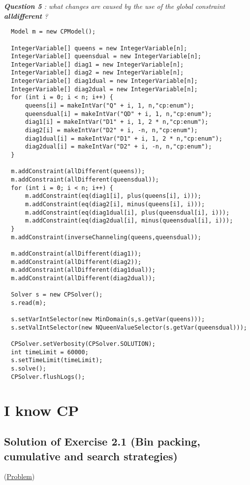 \noindent\emph{\textbf{Question 5} : what changes are caused by the use of the global constraint \textbf{alldifferent} ?}

\begin{lstlisting}
  Model m = new CPModel();
	
  IntegerVariable[] queens = new IntegerVariable[n];
  IntegerVariable[] queensdual = new IntegerVariable[n];
  IntegerVariable[] diag1 = new IntegerVariable[n];
  IntegerVariable[] diag2 = new IntegerVariable[n];
  IntegerVariable[] diag1dual = new IntegerVariable[n];
  IntegerVariable[] diag2dual = new IntegerVariable[n];
  for (int i = 0; i < n; i++) {
      queens[i] = makeIntVar("Q" + i, 1, n,"cp:enum");
      queensdual[i] = makeIntVar("QD" + i, 1, n,"cp:enum");
      diag1[i] = makeIntVar("D1" + i, 1, 2 * n,"cp:enum");
      diag2[i] = makeIntVar("D2" + i, -n, n,"cp:enum");
      diag1dual[i] = makeIntVar("D1" + i, 1, 2 * n,"cp:enum");
      diag2dual[i] = makeIntVar("D2" + i, -n, n,"cp:enum");
  }
	
  m.addConstraint(allDifferent(queens));
  m.addConstraint(allDifferent(queensdual));
  for (int i = 0; i < n; i++) {
      m.addConstraint(eq(diag1[i], plus(queens[i], i)));
      m.addConstraint(eq(diag2[i], minus(queens[i], i)));
      m.addConstraint(eq(diag1dual[i], plus(queensdual[i], i)));
      m.addConstraint(eq(diag2dual[i], minus(queensdual[i], i)));
  }
  m.addConstraint(inverseChanneling(queens,queensdual));
	
  m.addConstraint(allDifferent(diag1));
  m.addConstraint(allDifferent(diag2));
  m.addConstraint(allDifferent(diag1dual));
  m.addConstraint(allDifferent(diag2dual));
	
  Solver s = new CPSolver();
  s.read(m);
	
  s.setVarIntSelector(new MinDomain(s,s.getVar(queens)));
  s.setValIntSelector(new NQueenValueSelector(s.getVar(queensdual)));
	
  CPSolver.setVerbosity(CPSolver.SOLUTION);
  int timeLimit = 60000;
  s.setTimeLimit(timeLimit);
  s.solve();
  CPSolver.flushLogs();
\end{lstlisting}

\section{I know CP}\label{solutions:iknowcp}\hypertarget{solutions:iknowcp}{}

\subsection{Solution of Exercise 2.1 (Bin packing, cumulative and search strategies)}\label{solutions:solutionofexercise2.1}\hypertarget{solutions:solutionofexercise2.1}{}
(\hyperlink{exercises:exercise2.1}{Problem})

